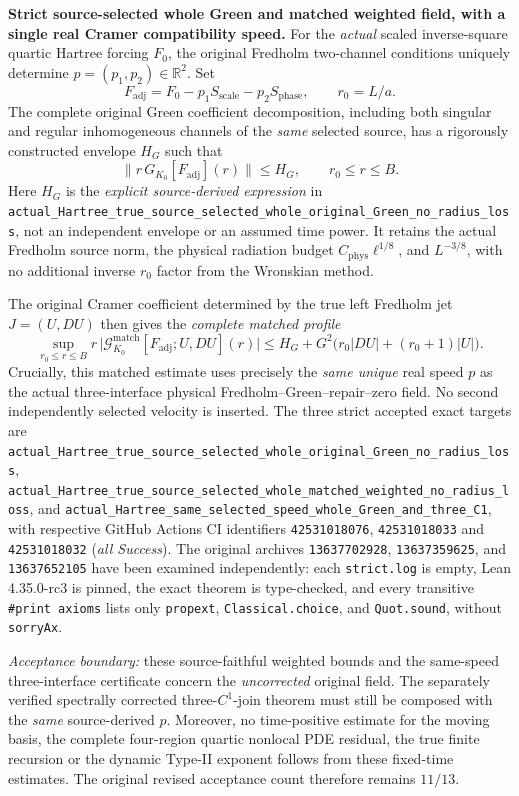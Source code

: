 \documentclass[11pt]{amsart}
\begin{document}
\medskip
\noindent\textbf{Strict source-selected whole Green and matched weighted
field, with a single real Cramer compatibility speed.}
For the \emph{actual} scaled inverse-square quartic Hartree forcing
\(F_0\), the original Fredholm two-channel conditions uniquely determine
\(p=(p_1,p_2)\in\mathbb R^2\). Set
\[
 F_{\mathrm{adj}}=F_0-p_1S_{\mathrm{scale}}
                       -p_2S_{\mathrm{phase}},\qquad
 r_0=L/a.
\]
The complete original Green coefficient decomposition, including both
singular and regular inhomogeneous channels of the \emph{same} selected
source, has a rigorously constructed envelope \(H_G\) such that
\[
 \|r\,G_{K_0}[F_{\mathrm{adj}}](r)\|
   \le H_G,\qquad r_0\le r\le B.
\]
Here \(H_G\) is the \emph{explicit source-derived expression} in
\texttt{actual\_Hartree\_true\_source\_selected\_whole\_original\_Green\_no\_radius\_loss},
not an independent envelope or an assumed time power. It retains
the actual Fredholm source norm, the physical radiation budget
\(C_{\mathrm{phys}}\ell^{1/8}\), and \(L^{-3/8}\), with no
additional inverse \(r_0\) factor from the Wronskian method.

The original Cramer coefficient determined by the true left Fredholm
jet \(J=(U,DU)\) then gives the \emph{complete matched profile}
\[
 \boxed{\;
 \sup_{r_0\le r\le B}r\,
 \bigl|\mathcal G_{K_0}^{\mathrm{match}}
           [F_{\mathrm{adj}};U,DU](r)\bigr|
 \le H_G+G^2\bigl(r_0|DU|+(r_0+1)|U|\bigr).\;}
\]
Crucially, this matched estimate uses precisely the \emph{same unique}
real speed \(p\) as the actual three-interface physical
Fredholm--Green--repair--zero field. No second independently selected
velocity is inserted. The three strict accepted exact targets are
\texttt{actual\_Hartree\_true\_source\_selected\_whole\_original\_Green\_no\_radius\_loss},
\texttt{actual\_Hartree\_true\_source\_selected\_whole\_matched\_weighted\_no\_radius\_loss},
and
\texttt{actual\_Hartree\_same\_selected\_speed\_whole\_Green\_and\_three\_C1},
with respective GitHub Actions CI identifiers
\texttt{42531018076}, \texttt{42531018033} and
\texttt{42531018032} (\emph{all Success}).
The original archives \texttt{13637702928},
\texttt{13637359625}, and \texttt{13637652105}
have been examined independently: each \texttt{strict.log}
is empty, Lean 4.35.0-rc3 is pinned, the exact theorem is
type-checked, and every transitive \texttt{\#print axioms}
lists only \texttt{propext}, \texttt{Classical.choice},
and \texttt{Quot.sound}, without \texttt{sorryAx}.

\emph{Acceptance boundary:} these source-faithful weighted
bounds and the same-speed three-interface certificate concern
the \emph{uncorrected} original field. The separately verified
spectrally corrected three-\(C^1\)-join theorem must still be
composed with the \emph{same} source-derived \(p\).
Moreover, no time-positive estimate for the moving basis,
the complete four-region quartic nonlocal PDE residual,
the true finite recursion or the dynamic Type-II exponent
follows from these fixed-time estimates. The original revised
acceptance count therefore remains \(11/13\).
\end{document}
